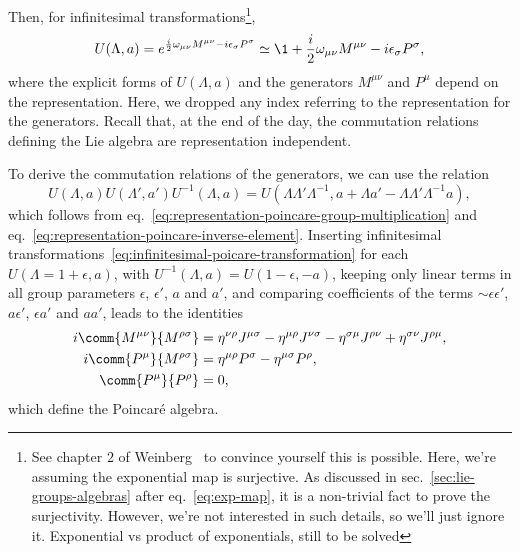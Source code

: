 Then, for infinitesimal transformations\footnote{See chapter $2$ of Weinberg~\cite{weinberg} to convince yourself this is possible. Here, we're assuming the exponential map is surjective. As discussed in sec.~\ref{sec:lie-groups-algebras} after eq.~\eqref{eq:exp-map}, it is a non-trivial fact to prove the surjectivity. However, we're not interested in such details, so we'll just ignore it. \color{red} Exponential vs product of exponentials, still to be solved \color{black}},
\begin{equation}\label{eq:infinitesimal-poicare-transformation}
    U(\Lambda, a) = e^{\frac{i}{2} \omega_{\mu\nu} M^{\mu\nu} - i \epsilon_\sigma P^\sigma} \simeq \1 + \frac{i}{2} \omega_{\mu\nu} M^{\mu\nu} - i \epsilon_\sigma P^\sigma,
\end{equation}
where the explicit forms of $U(\Lambda,a)$ and the generators $M^{\mu\nu}$ and $P^\mu$ depend on the representation. Here, we dropped any index referring to the representation for the generators. Recall that, at the end of the day, the commutation relations defining the Lie algebra are representation independent.

To derive the commutation relations of the generators, we can use the relation
\begin{equation}
    U(\Lambda, a) U(\Lambda',a') U^{-1}(\Lambda,a) = U(\Lambda \Lambda' \Lambda^{-1}, a + \Lambda a' - \Lambda \Lambda' \Lambda^{-1}a) ,
\end{equation}
which follows from eq.~\eqref{eq:representation-poincare-group-multiplication} and eq.~\eqref{eq:representation-poincare-inverse-element}. Inserting infinitesimal transformations~\eqref{eq:infinitesimal-poicare-transformation} for each $U(\Lambda = 1 + \epsilon, a)$, with $U^{-1} (\Lambda,a) = U(1-\epsilon,-a)$, keeping only linear terms in all group parameters $\epsilon$, $\epsilon'$, $a$ and $a'$, and comparing coefficients of the terms $\sim \epsilon\epsilon'$, $a\epsilon'$, $\epsilon a'$ and $aa'$, leads to the identities
\begin{subequations}
\begin{align}
    i \comm{M^{\mu\nu}}{M^{\rho\sigma}} &= \eta^{\nu\rho} J^{\mu\sigma} - \eta^{\mu\rho} J^{\nu\sigma} - \eta^{\sigma\mu} J^{\rho\nu} + \eta^{\sigma\nu} J^{\rho\mu} , \\
    i \comm{P^\mu}{M^{\rho\sigma}} &= \eta^{\mu\rho} P^\sigma - \eta^{\mu\sigma} P^\rho , \\
    \comm{P^\mu}{P^\rho} &= 0 ,
\end{align}
\end{subequations}
which define the Poincaré algebra.

